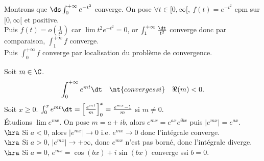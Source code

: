 \documentclass[11pt]{article}
\begin{document}
\begin{ex}{}{}
    Montrons que $\ds\int_0^{+\infty}e^{-t^2}$ converge.
    \tcblower
    On pose $\forall t \in [0,\infty[, ~ f(t)=e^{-t^2}$ cpm sur $[0,\infty[$ et positive.\\
    Puis $f(t)=o(\frac{1}{t^2})$ car $\lim t^2e^{-t^2}=0$, or $\int_1^{+\infty}\frac{\dt}{t^2}$ converge donc par comparaison, $\int_1^{+\infty}f$ converge.\\
    Puis $\int_0^{+\infty}f$ converge par localisation du problème de convergence.
\end{ex}

\begin{prop}{}{}
    Soit $m\in\C$.
    \begin{equation*}
        \int_0^{+\infty}e^{mt}\dt \quad \nt{converge ssi} \quad \Re(m)<0.
    \end{equation*}
    \tcblower
    Soit $x\geq0$. $\int_0^xe^{mt}\dt=\left[ \frac{e^{mt}}{m} \right]_0^x=\frac{e^{mx}-1}{m}$ si $m\neq0$.\\
    Étudions $\lim e^{mx}$. On pose $m=a+ib$, alors $e^{mx}=e^{ax}e^{ibx}$ puis $|e^{mx}|=e^{ax}$.\\
    $\hra$ Si $a<0$, alors $|e^{mx}|\to 0$ i.e. $e^{mx}\to0$ donc l'intégrale converge.\\
    $\hra$ Si $a>0$, $|e^{mx}|\to+\infty$, donc $e^{mx}$ n'est pas borné, donc l'intégrale diverge.\\
    $\hra$ Si $a=0$, $e^{mx}=\cos(bx)+i\sin(bx)$ converge ssi $b=0$.
\end{prop}
\end{document}
